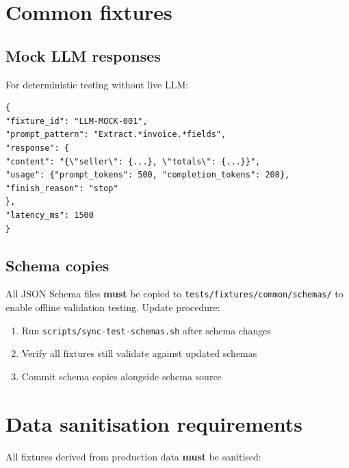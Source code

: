 \documentclass[12pt,a4paper,twoside]{report}
\begin{document}
\section{Common fixtures}

\subsection{Mock LLM responses}

For deterministic testing without live LLM:

\begin{lstlisting}[basicstyle=\ttfamily\small,caption={Mock LLM response fixture.}]
{
"fixture_id": "LLM-MOCK-001",
"prompt_pattern": "Extract.*invoice.*fields",
"response": {
"content": "{\"seller\": {...}, \"totals\": {...}}",
"usage": {"prompt_tokens": 500, "completion_tokens": 200},
"finish_reason": "stop"
},
"latency_ms": 1500
}
\end{lstlisting}

\subsection{Schema copies}

All JSON Schema files \textbf{must} be copied to \texttt{tests/fixtures/common/schemas/}
to enable offline validation testing. Update procedure:

\begin{enumerate}
\item Run \texttt{scripts/sync-test-schemas.sh} after schema changes
\item Verify all fixtures still validate against updated schemas
\item Commit schema copies alongside schema source
\end{enumerate}

\section{Data sanitisation requirements}

All fixtures derived from production data \textbf{must} be sanitised:
\end{document}
